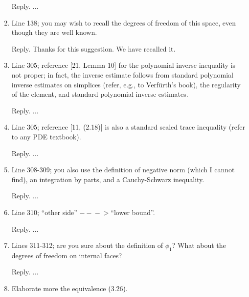 \documentclass[10pt]{amsart}
\theoremstyle{definition}
\theoremstyle{remark}
\begin{document}
\begin{enumerate}[1.]
\smallskip \noindent \textcolor[rgb]{1.00,0.00,0.00}{Reply.}
...

\medskip

\item \textsf{Line 138; you may wish to recall the degrees of freedom of this space, even though they are well known.}

\smallskip \noindent \textcolor[rgb]{1.00,0.00,0.00}{Reply.}
Thanks for this suggestion. We have recalled it.


\medskip

\item \textsf{Line 305; reference [21, Lemma 10] for the polynomial inverse inequality is not proper; in fact, the inverse estimate follows from standard polynomial inverse estimates on simplices (refer, e.g., to Verf{\"u}rth's book), the regularity of the element, and standard polynomial inverse estimates.}

\smallskip \noindent \textcolor[rgb]{1.00,0.00,0.00}{Reply.}
...

\medskip

\item \textsf{Line 305; reference [11, (2.18)] is also a standard scaled trace inequality (refer to any PDE textbook).}

\smallskip \noindent \textcolor[rgb]{1.00,0.00,0.00}{Reply.}
...

\medskip

\item \textsf{Line 308-309; you also use the definition of negative norm (which I cannot find), an integration by parts, and a Cauchy-Schwarz inequality.}

\smallskip \noindent \textcolor[rgb]{1.00,0.00,0.00}{Reply.}
...

\medskip

\item \textsf{Line 310; “other side” $-\!\!\!-\!\!\!-\!\!\!>$“lower bound”.}

\smallskip \noindent \textcolor[rgb]{1.00,0.00,0.00}{Reply.}
...

\medskip

\item \textsf{Lines 311-312; are you sure about the definition of $\phi_1$? What about the degrees of freedom on internal faces?}

\smallskip \noindent \textcolor[rgb]{1.00,0.00,0.00}{Reply.}
...

\medskip

\item \textsf{Elaborate more the equivalence (3.26).}


\end{enumerate}
\end{document}
